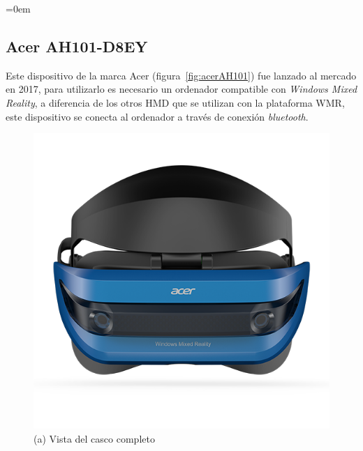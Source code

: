 \parindent=0em
\subsection{Acer AH101-D8EY}
\noindent

Este dispositivo de la marca Acer (figura~\ref{fig:acerAH101}) fue lanzado al mercado en 2017, para utilizarlo es necesario un ordenador compatible con \textit{Windows Mixed Reality}, a diferencia de los otros HMD que se utilizan con la plataforma WMR, este dispositivo se conecta al ordenador a través de conexión \textit{bluetooth}.\\

\begin{figure}[H]
\centering
    \hspace{-4mm}
    \begin{minipage}[t]{0.5\textwidth}
        \centering
        \includegraphics[scale=0.30]{Images/Estado del arte/acerh101.png}\\
        (a) Vista del casco completo
    \end{minipage}
    \begin{minipage}[t]{0.5\textwidth}
        \centering

\end{minipage}
\end{figure}
